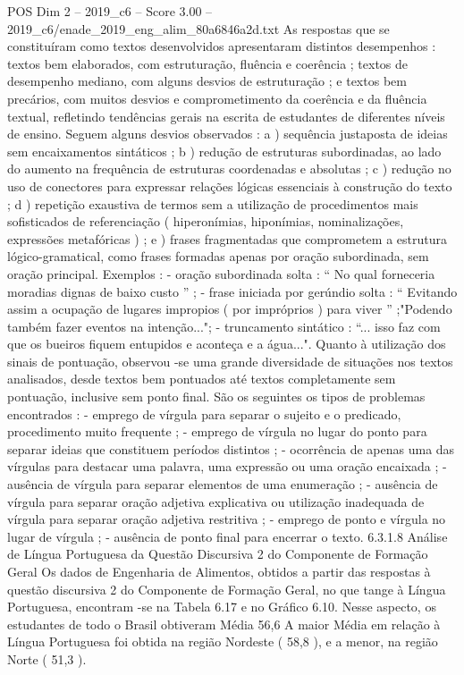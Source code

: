 \begin{textsample}{POS Dim 2 – 2019\_c6 – Score 3.00 – 2019\_c6/enade\_2019\_eng\_alim\_80a6846a2d.txt}
As respostas que se constituíram como textos desenvolvidos apresentaram distintos desempenhos : textos bem elaborados, com estruturação, fluência e coerência ; textos de desempenho mediano, com alguns desvios de estruturação ; e textos bem precários, com muitos desvios e comprometimento da coerência e da fluência textual, refletindo tendências gerais na escrita de estudantes de diferentes níveis de ensino.
Seguem alguns desvios observados : a ) sequência justaposta de ideias sem encaixamentos sintáticos ; b ) redução de estruturas subordinadas, ao lado do aumento na frequência de estruturas coordenadas e absolutas ; c ) redução no uso de conectores para expressar relações lógicas essenciais à construção do texto ; d ) repetição exaustiva de termos sem a utilização de procedimentos mais sofisticados de referenciação ( hiperonímias, hiponímias, nominalizações, expressões metafóricas ) ; e ) frases fragmentadas que comprometem a estrutura lógico-gramatical, como frases formadas apenas por oração subordinada, sem oração principal.
Exemplos : - oração subordinada solta : “ No qual forneceria moradias dignas de baixo custo ” ; - frase iniciada por gerúndio solta : “ Evitando assim a ocupação de lugares impropios ( por impróprios ) para viver ” ;"Podendo também fazer eventos na intenção..."; - truncamento sintático : “... isso faz com que os bueiros fiquem entupidos e aconteça e a água...".
Quanto à utilização dos sinais de pontuação, observou -se uma grande diversidade de situações nos textos analisados, desde textos bem pontuados até textos completamente sem pontuação, inclusive sem ponto final.
São os seguintes os tipos de problemas encontrados : - emprego de vírgula para separar o sujeito e o predicado, procedimento muito frequente ; - emprego de vírgula no lugar do ponto para separar ideias que constituem períodos distintos ; - ocorrência de apenas uma das vírgulas para destacar uma palavra, uma expressão ou uma oração encaixada ; - ausência de vírgula para separar elementos de uma enumeração ; - ausência de vírgula para separar oração adjetiva explicativa ou utilização inadequada de vírgula para separar oração adjetiva restritiva ; - emprego de ponto e vírgula no lugar de vírgula ; - ausência de ponto final para encerrar o texto. 6.3.1.8 Análise de Língua Portuguesa da Questão Discursiva 2 do Componente de Formação Geral Os dados de Engenharia de Alimentos, obtidos a partir das respostas à questão discursiva 2 do Componente de Formação Geral, no que tange à Língua Portuguesa, encontram -se na Tabela 6.17 e no Gráfico 6.10.
Nesse aspecto, os estudantes de todo o Brasil obtiveram Média 56,6 A maior Média em relação à Língua Portuguesa foi obtida na região Nordeste ( 58,8 ), e a menor, na região Norte ( 51,3 ).

\end{textsample}
